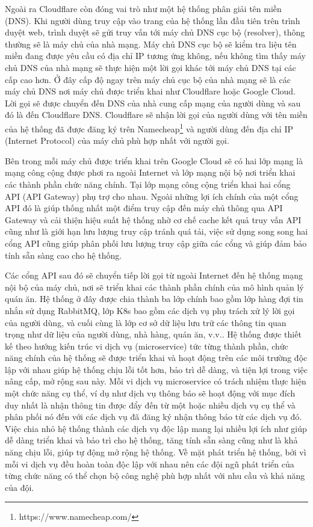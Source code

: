Ngoài ra Cloudflare còn đóng vai trò như một hệ thống phân giải tên miền (DNS).
Khi người dùng truy cập vào trang của hệ thống lần đầu tiên trên trình duyệt web, trình duyệt sẽ gửi truy vấn tới máy chủ DNS cục bộ (resolver), thông thường sẽ là máy chủ của nhà mạng.
Máy chủ DNS cục bộ sẽ kiểm tra liệu tên miền đang được yêu cầu có địa chỉ IP tương ứng không, nếu không tìm thấy máy chủ DNS của nhà mạng sẽ thực hiện một lời gọi khác tới máy chủ DNS tại các cấp cao hơn.
Ở đây cấp độ ngay trên máy chủ cục bộ của nhà mạng sẽ là các máy chủ DNS nơi máy chủ được triển khai như Cloudflare hoặc Google Cloud.
Lời gọi sẽ được chuyển đến DNS của nhà cung cấp mạng của người dùng và sau đó là đến Cloudflare DNS.
Cloudflare sẽ nhận lời gọi của người dùng với tên miền của hệ thống đã được đăng ký trên Namecheap\footnote{https://www.namecheap.com/} và người dùng đến địa chỉ IP (Internet Protocol) của máy chủ phù hợp nhất với người gọi.

Bên trong mỗi máy chủ được triển khai trên Google Cloud sẽ có hai lớp mạng là mạng công cộng được phơi ra ngoài Internet và lớp mạng nội bộ nơi triển khai các thành phần chức năng chính.
Tại lớp mạng công cộng triển khai hai cổng API (API Gateway) phụ trợ cho nhau.
Ngoài những lợi ích chính của một cổng API đó là giúp thống nhất một điểm truy cập đến máy chủ thông qua API Gateway và cải thiện hiệu suất hệ thống nhờ cơ chế cache kết quả truy vấn API cũng như là giới hạn lưu lượng truy cập tránh quá tải, việc sử dụng song song hai cổng API cũng giúp phân phối lưu lượng truy cập giữa các cổng và giúp đảm bảo tính sẵn sàng cao cho hệ thống.

Các cổng API sau đó sẽ chuyển tiếp lời gọi từ ngoài Internet đến hệ thống mạng nội bộ của máy chủ, nơi sẽ triển khai các thành phần chính của mô hình quản lý quán ăn.
Hệ thống ở đây được chia thành ba lớp chính bao gồm lớp hàng đợi tin nhắn sử dụng RabbitMQ, lớp K8s bao gồm các dịch vụ phụ trách xử lý lời gọi của người dùng, và cuối cùng là lớp cơ sở dữ liệu lưu trữ các thông tin quan trọng như dữ liệu của người dùng, nhà hàng, quán ăn, v.v..
Hệ thống được thiết kế theo hướng kiến trúc vi dịch vụ (microservice) tức từng thành phần, chức năng chính của hệ thống sẽ được triển khai và hoạt động trên các môi trường độc lập với nhau giúp hệ thống chịu lỗi tốt hơn, bảo trì dễ dàng, và tiện lợi trong việc nâng cấp, mở rộng sau này.
Mỗi vi dịch vụ microservice có trách nhiệm thực hiện một chức năng cụ thể, ví dụ như dịch vụ thông báo sẽ hoạt động với mục đích duy nhất là nhận thông tin được đẩy đến từ một hoặc nhiều dịch vụ cụ thể và phân phối nó đến với các dịch vụ đã đăng ký nhận thông báo từ các dịch vụ đó.
Việc chia nhỏ hệ thống thành các dịch vụ độc lập mang lại nhiều lợi ích như giúp dễ dàng triển khai và bảo trì cho hệ thống, tăng tính sẵn sàng cũng như là khả năng chịu lỗi, giúp tự động mở rộng hệ thống.
Về mặt phát triển hệ thống, bởi vì mỗi vi dịch vụ đều hoàn toàn độc lập với nhau nên các đội ngũ phát triển của từng chức năng có thể chọn bộ công nghệ phù hợp nhất với nhu cầu và khả năng của đội.

